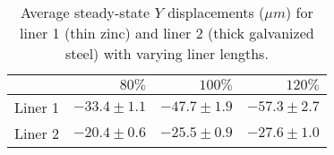 \begin{table}[htbp!]
\centering
\begin{tabular}{lrrr}
\toprule
  & $80\%$ & $100\%$ & $120\%$ \\
\midrule
 Liner 1 & $-33.4 \pm 1.1$ & $-47.7 \pm 1.9$ & $-57.3 \pm 2.7$ \\
 Liner 2 & $-20.4 \pm 0.6$ & $-25.5 \pm 0.9$ & $-27.6 \pm 1.0$ \\
\bottomrule
\end{tabular}
\caption{Average steady-state $Y$ displacements ($\mu m$) for liner 1 (thin zinc) and liner 2 (thick galvanized steel) with varying liner lengths.}
\label{fig:avg_results_table}
\end{table}